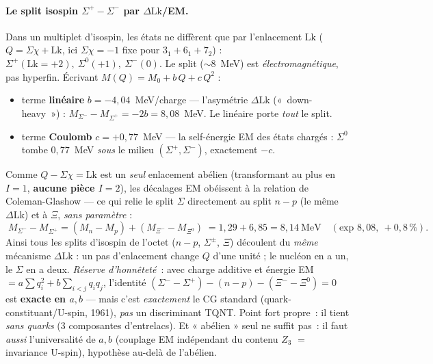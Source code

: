 \documentclass[11pt]{article}
\begin{document}
\paragraph{Le split isospin $\Sigma^+{-}\Sigma^-$ par $\Delta\mathrm{Lk}$/EM.}
Dans un multiplet d'isospin, les états ne diffèrent que par l'enlacement $\mathrm{Lk}$ ($Q=\Sigma\chi+\mathrm{Lk}$, ici $\Sigma\chi{=}{-}1$ fixe pour $3_1{+}6_1{+}7_2$) : $\Sigma^+(\mathrm{Lk}{=}{+}2),\ \Sigma^0({+}1),\ \Sigma^-(0)$. Le split ($\sim$8~MeV) est \emph{électromagnétique}, pas hyperfin. Écrivant $M(Q)=M_0+b\,Q+c\,Q^2$ :
\begin{itemize}\itemsep1pt
\item terme \textbf{linéaire} $b=-4{,}04$~MeV/charge --- l'asymétrie $\Delta\mathrm{Lk}$ («~down-heavy~») : $M_{\Sigma^-}-M_{\Sigma^+}=-2b=8{,}08$~MeV. Le linéaire porte \emph{tout} le split.
\item terme \textbf{Coulomb} $c=+0{,}77$~MeV --- la self-énergie EM des états chargés : $\Sigma^0$ tombe $0{,}77$~MeV \emph{sous} le milieu $(\Sigma^+,\Sigma^-)$, exactement $-c$.
\end{itemize}
Comme $Q-\Sigma\chi=\mathrm{Lk}$ est un \emph{seul} enlacement abélien (transformant au plus en $I{=}1$, \textbf{aucune pièce $I{=}2$}), les décalages EM obéissent à la relation de Coleman-Glashow --- ce qui relie le split $\Sigma$ directement au split $n{-}p$ (le même $\Delta\mathrm{Lk}$) et à $\Xi$, \emph{sans paramètre} :
\[
\boxed{\;M_{\Sigma^-}-M_{\Sigma^+}=(M_n-M_p)+(M_{\Xi^-}-M_{\Xi^0})\;}
=1{,}29+6{,}85=8{,}14~\text{MeV}\quad(\text{exp }8{,}08,\ +0{,}8\,\%).
\]
Ainsi tous les splits d'isospin de l'octet ($n{-}p$, $\Sigma^\pm$, $\Xi$) découlent du \emph{même} mécanisme $\Delta\mathrm{Lk}$ : un pas d'enlacement change $Q$ d'une unité ; le nucléon en a un, le $\Sigma$ en a deux. \emph{Réserve d'honnêteté}~: avec charge additive et énergie EM $=a\sum q_i^2+b\sum_{i<j}q_iq_j$, l'identité $(\Sigma^-{-}\Sigma^+){-}(n{-}p){-}(\Xi^-{-}\Xi^0)=0$ est \textbf{exacte en $a,b$} --- mais c'est \emph{exactement} le CG standard (quark-constituant/U-spin, 1961), \emph{pas} un discriminant TQNT. Point fort propre~: il tient \emph{sans quarks} (3 composantes d'entrelacs). Et « abélien » seul ne suffit pas~: il faut \emph{aussi} l'universalité de $a,b$ (couplage EM indépendant du contenu $Z_3$ $=$ invariance U-spin), hypothèse au-delà de l'abélien.
\end{document}
